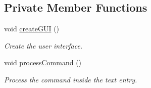 \subsection*{Private Member Functions}
\begin{DoxyCompactItemize}
\item 
void \hyperlink{classpkg__game_1_1UserInterface_a59c8cbb0d8b4c70d128bec2076b920fe}{create\-G\-U\-I} ()
\begin{DoxyCompactList}\small\item\em Create the user interface. \end{DoxyCompactList}\item 
void \hyperlink{classpkg__game_1_1UserInterface_ae708d0c4af18579b5c9fc3b671fcc03f}{process\-Command} ()
\begin{DoxyCompactList}\small\item\em Process the command inside the text entry. \end{DoxyCompactList}\end{DoxyCompactItemize}
